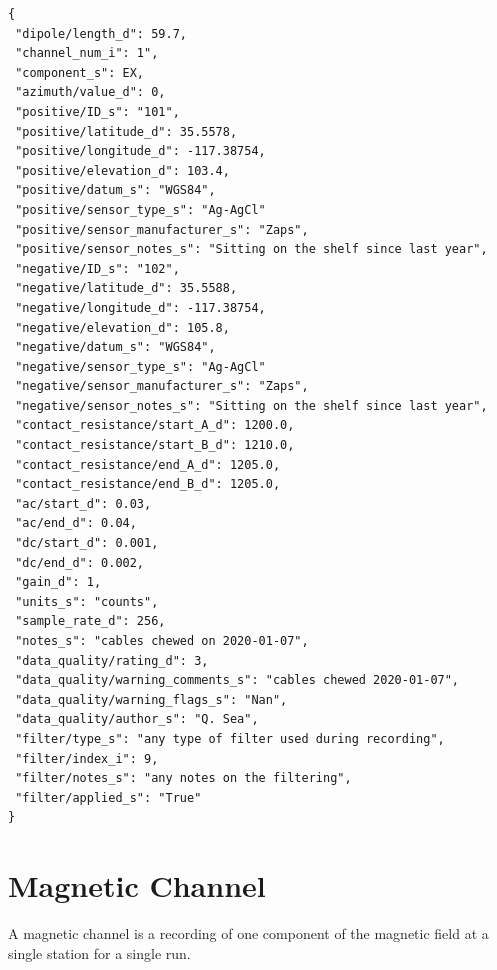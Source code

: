 \documentclass{article}
\begin{document}
\begin{verbatim}
{
 "dipole/length_d": 59.7,
 "channel_num_i": 1",
 "component_s": EX,
 "azimuth/value_d": 0,
 "positive/ID_s": "101",
 "positive/latitude_d": 35.5578,
 "positive/longitude_d": -117.38754,
 "positive/elevation_d": 103.4,
 "positive/datum_s": "WGS84",
 "positive/sensor_type_s": "Ag-AgCl"
 "positive/sensor_manufacturer_s": "Zaps",
 "positive/sensor_notes_s": "Sitting on the shelf since last year",
 "negative/ID_s": "102",
 "negative/latitude_d": 35.5588,
 "negative/longitude_d": -117.38754,
 "negative/elevation_d": 105.8,
 "negative/datum_s": "WGS84",
 "negative/sensor_type_s": "Ag-AgCl"
 "negative/sensor_manufacturer_s": "Zaps",
 "negative/sensor_notes_s": "Sitting on the shelf since last year",
 "contact_resistance/start_A_d": 1200.0,
 "contact_resistance/start_B_d": 1210.0,
 "contact_resistance/end_A_d": 1205.0,
 "contact_resistance/end_B_d": 1205.0,
 "ac/start_d": 0.03,
 "ac/end_d": 0.04,
 "dc/start_d": 0.001,
 "dc/end_d": 0.002,
 "gain_d": 1,
 "units_s": "counts",
 "sample_rate_d": 256,
 "notes_s": "cables chewed on 2020-01-07",
 "data_quality/rating_d": 3,
 "data_quality/warning_comments_s": "cables chewed 2020-01-07",
 "data_quality/warning_flags_s": "Nan",
 "data_quality/author_s": "Q. Sea",
 "filter/type_s": "any type of filter used during recording",
 "filter/index_i": 9,
 "filter/notes_s": "any notes on the filtering",
 "filter/applied_s": "True"
}
\end{verbatim}

\newpage
\section{Magnetic Channel}

A magnetic channel is a recording of one component of the magnetic field at a single station for a single run.
\end{document}
